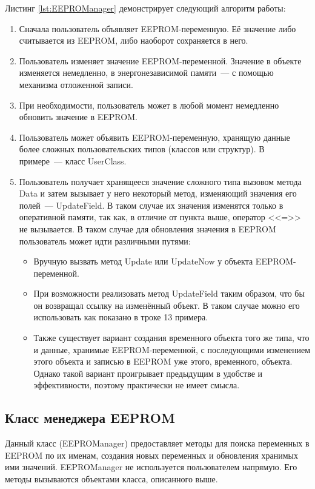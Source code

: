 Листинг \ref{lst:EEPROManager} демонстрирует следующий алгоритм работы:
\begin{enumerate}
	\item Сначала пользователь объявляет EEPROM-переменную.
	Её значение либо считывается из EEPROM, либо наоборот сохраняется в него.
	\item Пользователь изменяет значение EEPROM-переменной. Значение в объекте изменяется немедленно, в энергонезависимой памяти~--- с помощью механизма отложенной записи.
	\item При необходимости, пользователь может в любой момент немедленно обновить значение в EEPROM.
	\item Пользователь может объявить EEPROM-переменную, хранящую данные более сложных пользовательских типов (классов или структур).
	В примере~--- класс UserClass.
	\item Пользователь получает хранящееся значение сложного типа вызовом метода Data и затем вызывает у него некоторый метод, изменяющий значения его полей~--- UpdateField.
	В таком случае их значения изменятся только в оперативной памяти, так как, в отличие от пункта выше, оператор <<=>> не вызывается.
	В таком случае для обновления значения в EEPROM пользователь может идти различными путями:
	\begin{itemize}
		\item Вручную вызвать метод Update или UpdateNow у объекта EEPROM-переменной.
		\item При возможности реализовать метод UpdateField таким образом, что бы он возвращал ссылку на изменённый объект.
		В таком случае можно его использовать как показано в троке 13 примера.
		\item Также существует вариант создания временного объекта того же типа, что и данные, хранимые EEPROM-переменной, с последующими изменением этого объекта и записью в EEPROM уже этого, временного, объекта.
		Однако такой вариант проигрывает предыдущим в удобстве и эффективности, поэтому практически не имеет смысла.
	\end{itemize}
\end{enumerate}

\subsection{Класс менеджера EEPROM}

Данный класс (EEPROManager) предоставляет методы для поиска переменных в EEPROM по их именам, создания новых переменных и обновления хранимых ими значений.
EEPROManager не используется пользователем напрямую.
Его методы вызываются объектами класса, описанного выше.

